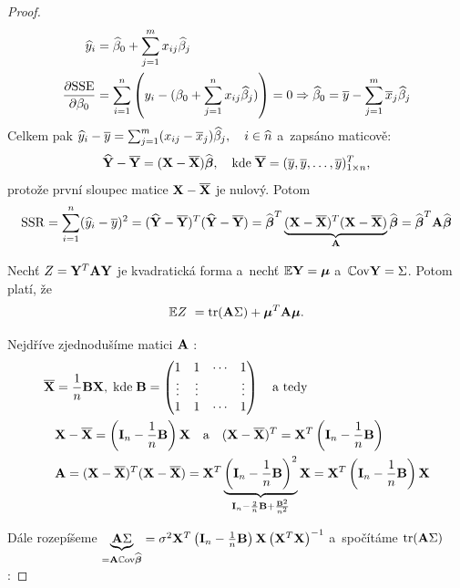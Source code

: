 \begin{proof}
	
\begin{align*}
	\hyi & = \wbeta_0 + \sumjm x_{ij} \wbeta_j \\
	\frac{\partial \SSE}{\partial \beta_0} & = \sumin \left(y_i - (\beta_0 + \sumjn x_{ij} \wbeta_j) \right) = 0 \Rightarrow \wbeta_0 = \ly - \sumjm \lx_j \wbeta_j
\end{align*}
Celkem pak $\hy_i - \ly = \sumjm (x_{ij} - \lx_j) \wbeta_j, \quad i\in\widehat{n} $ a~zapsáno maticově:
 $$
\hYb - \lYb = (\X - \lX) \wbetab, \quad \text{kde} \; \lYb = (\ly, \ly,\dots, \ly)_{1 \times n}^T,
 $$
protože první sloupec matice $\X - \lX$ je nulový. Potom
 $$
\SSR = \sumin (\hy_i - \ly)^2 = (\hYb - \lYb)^T(\hYb - \lYb) = \wbetab^T \underbrace{(\X - \lX)^T(\X - \lX)}_{\Am} \wbetab = \wbetab^T \Am \wbetab
 $$

\begin{theorem}
	Nechť $Z = \Y^T \Am \Y$ je kvadratická forma a~nechť $\E \Y = \bmu$ a~$\Cov \Y = \Sigma$. Potom platí, že
	 $$
		\E Z~ = \trace(\Am \Sigma) + \bmu^T \Am \bmu.
	 $$
\end{theorem}

Nejdříve zjednodušíme matici $\Am$ :
\begin{align*}
	\lX & = \frac{1}{n} \Bm \X, \; \text{kde} \; \Bm = \begin{pmatrix}
	1 & 1 & \cdots & 1 \\
	\vdots & \vdots & & \vdots \\
	1 & 1 & \cdots & 1
	\end{pmatrix} \quad \text{a tedy} \\
	& \X - \lX = \left(\Identita{n} - \frac{1}{n} \Bm \right) \X \quad \text{a} \quad (\X - \lX)^T = \X^T \left(\Identita{n} - \frac{1}{n} \Bm \right) \\
	& \Am = (\X - \lX)^T(\X - \lX) = \X^T \underbrace{\left(\Identita{n} - \frac{1}{n} \Bm \right)^2}_{\Identita{n} - \frac{2}{n} \Bm + \frac{\Bm^2}{n^2}} \X = \X^T \left(\Identita{n} - \frac{1}{n} \Bm \right) \X
\end{align*}

Dále rozepíšeme $\underbrace{\Am \Sigma}_{ = \Am \Cov \wbetab} = \sigma^2 \X^T \left(\Identita{n} - \frac{1}{n} \Bm \right) \X \left(\X^T \X \right)^{-1}$ a~spočítáme $\trace (\Am \Sigma)$ :


\end{proof}
